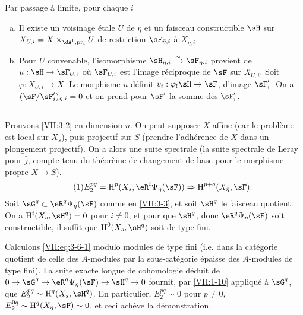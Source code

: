 Par passage \`a limite, pour chaque $i$
\begin{enumerate}[a)]
  \item Il existe un voisinage \'etale $U$ de $\bar\eta$ et un faisceau 
    constructible $\sH$ sur $X_{U,i} = X\times_{\dA^1,\pr_i} U$ de restriction 
    $\sF_{\bar\eta,i}$ \`a $X_{\bar\eta,i}$. 
  \item Pour $U$ convenable, l'isomorphisme 
    $\sH_{\bar\eta,i} \iso \sF_{\bar\eta,i}$ provient de $u:\sH\to \sF_{U,i}$ 
    o\`u $\sF_{U,i}$ est l'image r\'eciproque de $\sF$ sur $X_{U,i}$. Soit 
    $\varphi:X_{U,i} \to X$. Le morphisme $u$ d\'efinit 
    $v_i:\varphi_! \sH \to \sF$, d'image $\sF_i'$. On a 
    $(\sF/\sF_i')_{\bar\eta,i} = 0$ et on prend pour $\sF'$ la somme des 
    $\sF_i'$. 
\end{enumerate}





\subsection{}\label{VII:3-6}

Prouvons \ref{VII:3-2} en dimension $n$. On peut supposer $X$ affine (car le 
probl\`eme est local sur $X_s$), puis projectif sur $S$ (prendre l'adh\'erence 
de $X$ dans un plongement projectif). On a alors une suite spectrale 
\cite[I 2.2.3]{sga7} (la suite spectrale de Leray pour $\bar j$, compte tenu du 
th\'eor\`eme de changement de base pour le morphisme propre $X\to S$). 
\begin{equation*}\tag{1}\label{VII:eq:3-6-1}
  E_2^{p q} = \h^p(X_s,\eR^i\Psi_\eta(\sF)) \Rightarrow \h^{p+q}(X_{\bar\eta},\sF) \text{.} 
\end{equation*}
Soit $\sG^q\subset \eR^q \Psi_\eta(\sF)$ comme en \ref{VII:3-3}, et soit 
$\sH^q$ le faisceau quotient. On a $\h^i(X_s,\sH^q)=0$ pour $i\ne 0$, et pour 
que $\sH^q$, donc $\eR^q\Psi_\eta(\sF)$ soit constructible, il suffit que 
$\h^0(X_s,\sH^q)$ soit de type fini. 

Calculons \eqref{VII:eq:3-6-1} modulo modules de type fini (i.e. dans la 
cat\'egorie quotient de celle des $A$-modules par la sous-cat\'egorie \'epaisse 
des $A$-modules de type fini). La suite exacte longue de cohomologie d\'eduit 
de $0 \to \sG^q \to \eR^q\Psi_\eta(\sF) \to \sH^q \to 0$ fournit, par 
\ref{VII:1-10} appliqu\'e \`a $\sG^q$, que $E_2^{p q} \sim \h^q(X_s,\sH^q)$. 
En particulier, $E_2^{p q}\sim 0$ pour $p\ne 0$, 
$E_2^{0 q}\sim \h^q(X_{\bar\eta},\sF) \sim 0$, et ceci ach\`eve la 
d\'emonstration. 

